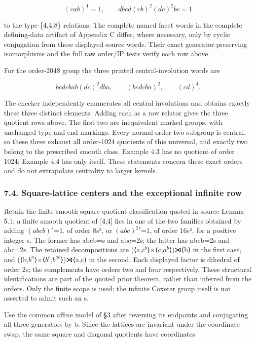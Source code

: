 \documentclass[
  11pt,
  a4paper,
]{article}
\begin{document}
\[
(cab)^4=1,\qquad dbcd(cb)^2(dc)^2bc=1
\tag{N3}
\]

to the type-\{4,4,8\} relations. The complete named facet words in the
complete defining-data artifact of Appendix C differ, where necessary,
only by cyclic conjugation from these displayed source words. Their
exact generator-preserving isomorphisms and the full raw order/IP tests
verify each row above.

For the order-2048 group the three printed central-involution words are

\[
bcdcbab(dc)^2dba,\qquad(bcdcba)^2,\qquad(cd)^4.
\tag{N4}
\]

The checker independently enumerates all central involutions and obtains
exactly these three distinct elements. Adding each as a raw relator
gives the three quotient rows above. The first two are inequivalent
marked groups, with unchanged type and end markings. Every normal
order-two subgroup is central, so these three exhaust all order-1024
quotients of this universal, and exactly two belong to the prescribed
smooth class. Example 4.3 has no quotient of order 1024; Example 4.4 has
only itself. These statements concern these exact orders and do not
extrapolate centrality to larger kernels.

\subsubsection{7.4. Square-lattice centers and the exceptional infinite
row}\label{square-lattice-centers-and-the-exceptional-infinite-row}

Retain the finite smooth square-quotient classification quoted in source
Lemma 5.1: a finite smooth quotient of {[}4,4{]} lies in one of the two
families obtained by adding \((abcb)^{s}\)=1, of order 8s², or
\((abc)^{2s}\)=1, of order 16s², for a positive integer s. The former
has \textbar abcb\textbar=s and \textbar abc\textbar=2s; the latter has
\textbar abcb\textbar=2s and \textbar abc\textbar=2s. The retained
decompositions are (⟨a,\(c^{b}\)⟩×⟨c,\(a^{b}\)⟩)⋊⟨b⟩ in the first case,
and (⟨b,\(b^{a}\)⟩×⟨\(b^{c}\),\(b^{ac}\)⟩)⋊⟨a,c⟩ in the second. Each
displayed factor is dihedral of order 2s; the complements have orders
two and four respectively. These structural identifications are part of
the quoted prior theorem, rather than inferred from the orders. Only the
finite scope is used; the infinite Coxeter group itself is not asserted
to admit such an s.

Use the common affine model of §3 after reversing its endpoints and
conjugating all three generators by b. Since the lattices are invariant
under the coordinate swap, the same square and diagonal quotients have
coordinates
\end{document}
